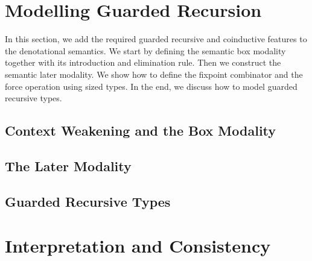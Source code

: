 \documentclass[a4paper,UKenglish,cleveref, autoref,numberwithinsect]{lipics-v2019}
\begin{document}
\section{Modelling Guarded Recursion}
\label{sec:guarded}
In this section, we add the required guarded
recursive and coinductive features to the denotational semantics.
We start by defining the semantic box modality together with its
introduction and elimination rule. Then we construct the semantic
later modality. We show how to define the fixpoint combinator and the
force operation using sized types. In the end, we discuss how to model
guarded recursive types.

\subsection{Context Weakening and the Box Modality}



\subsection{The Later Modality}
\label{sec:later}




\subsection
{Guarded Recursive Types}
\label{sec:grt}


\section{Interpretation and Consistency}
\label{sec:consistent}




%
\end{document}
